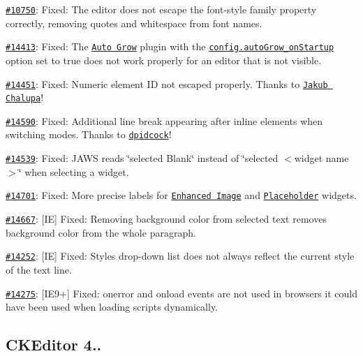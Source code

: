 \begin{DoxyItemize}
\item \href{http://dev.ckeditor.com/ticket/10750}{\tt \#10750}\+: Fixed\+: The editor does not escape the {\ttfamily font-\/style} family property correctly, removing quotes and whitespace from font names.
\item \href{http://dev.ckeditor.com/ticket/14413}{\tt \#14413}\+: Fixed\+: The \href{http://ckeditor.com/addon/autogrow}{\tt Auto Grow} plugin with the \href{http://docs.ckeditor.com/#!/api/CKEDITOR.config-cfg-autoGrow_onStartup}{\tt {\ttfamily config.\+auto\+Grow\+\_\+on\+Startup}} option set to {\ttfamily true} does not work properly for an editor that is not visible.
\item \href{http://dev.ckeditor.com/ticket/14451}{\tt \#14451}\+: Fixed\+: Numeric element ID not escaped properly. Thanks to \href{https://github.com/chaluja7}{\tt Jakub Chalupa}!
\item \href{http://dev.ckeditor.com/ticket/14590}{\tt \#14590}\+: Fixed\+: Additional line break appearing after inline elements when switching modes. Thanks to \href{https://github.com/dpidcock}{\tt dpidcock}!
\item \href{https://dev.ckeditor.com/ticket/14539}{\tt \#14539}\+: Fixed\+: J\+A\+WS reads \char`\"{}selected Blank\char`\"{} instead of \char`\"{}selected $<$widget name$>$\char`\"{} when selecting a widget.
\item \href{http://dev.ckeditor.com/ticket/14701}{\tt \#14701}\+: Fixed\+: More precise labels for \href{http://ckeditor.com/addon/image2}{\tt Enhanced Image} and \href{http://ckeditor.com/addon/placeholder}{\tt Placeholder} widgets.
\item \href{http://dev.ckeditor.com/ticket/14667}{\tt \#14667}\+: \mbox{[}IE\mbox{]} Fixed\+: Removing background color from selected text removes background color from the whole paragraph.
\item \href{http://dev.ckeditor.com/ticket/14252}{\tt \#14252}\+: \mbox{[}IE\mbox{]} Fixed\+: Styles drop-\/down list does not always reflect the current style of the text line.
\item \href{http://dev.ckeditor.com/ticket/14275}{\tt \#14275}\+: \mbox{[}I\+E9+\mbox{]} Fixed\+: {\ttfamily onerror} and {\ttfamily onload} events are not used in browsers it could have been used when loading scripts dynamically.
\end{DoxyItemize}

\subsection*{C\+K\+Editor 4..}


